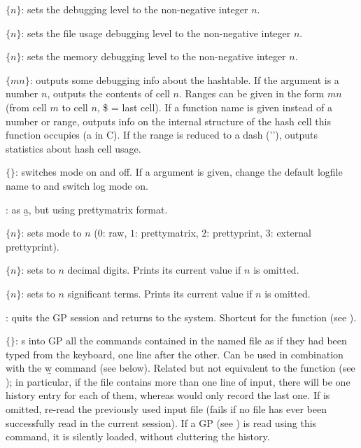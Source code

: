  $\{n\}$: sets the debugging level  to the
non-negative integer $n$.

 $\{n\}$: sets the file usage debugging level 
to the non-negative integer $n$.

 $\{n\}$: sets the memory debugging level 
to the non-negative integer $n$.

 $\{m$\kbd{-}$n\}$: outputs some debugging info about the
hashtable. If the argument is a number $n$, outputs the contents of cell
$n$. Ranges can be given in the form $m$\kbd{-}$n$ (from cell $m$ to cell
$n$, \$ = last cell). If a function name is given instead of a number or
range, outputs info on the internal structure of the hash cell this
function occupies (a  in C). If the range is reduced to
a dash ('\kbd{-}'), outputs statistics about hash cell usage.

 $\{$$\}$: switches  mode on and off.
If a  argument is given, change the default logfile name to 
 and switch log mode on.

: as \b{a}, but using prettymatrix format.

 $\{n\}$: sets  mode to $n$ ($0$: raw, $1$:
prettymatrix, $2$: prettyprint, $3$: external prettyprint).

 $\{n\}$: sets  to $n$ decimal
digits. Prints its current value if $n$ is omitted.

 $\{n\}$: sets  to $n$ significant terms.
Prints its current value if $n$ is omitted.

: quits the GP session and returns to the system.
Shortcut for the function  (see ).

 $\{$$\}$: s into GP all the commands
contained in the named file as if they had been typed from the keyboard, one
line after the other. Can be used in combination with the \b{w} command (see
below). Related but not equivalent to the function  (see
); in particular, if the file contains more than one line of
input, there will be one history entry for each of them, whereas 
would only record the last one. If  is omitted, re-read the
previously used input file (fails if no file has ever been successfully read
in the current session). If a GP  (see )
is read using this command, it is silently loaded, without cluttering the
history.

